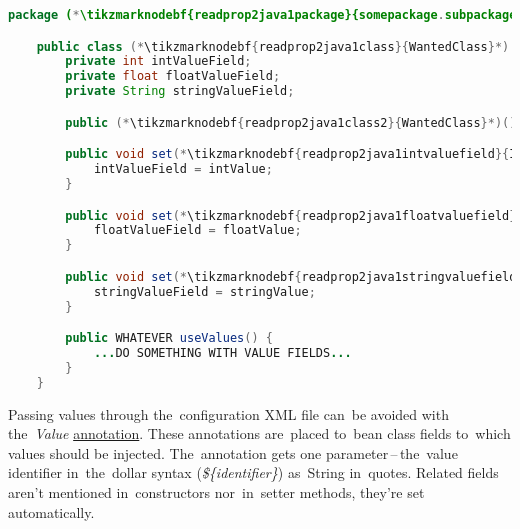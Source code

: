 \begin{lstlisting}[language=Java, title={Wanted class with the zero--parameter constructor and setter methods}]
    package (*\tikzmarknodebf{readprop2java1package}{somepackage.subpackage}*);

    public class (*\tikzmarknodebf{readprop2java1class}{WantedClass}*) implements WantedInterface {
        private int intValueField;
        private float floatValueField;
        private String stringValueField;

        public (*\tikzmarknodebf{readprop2java1class2}{WantedClass}*)() {}

        public void set(*\tikzmarknodebf{readprop2java1intvaluefield}{IntValueField}*)(int intValue) {
            intValueField = intValue;
        }

        public void set(*\tikzmarknodebf{readprop2java1floatvaluefield}{FloatValueField}*)(float floatValue) {
            floatValueField = floatValue;
        }

        public void set(*\tikzmarknodebf{readprop2java1stringvaluefield}{StringValueField}*)(string stringValue) {
            stringValueField = stringValue;
        }

        public WHATEVER useValues() {
            ...DO SOMETHING WITH VALUE FIELDS...
        }
    }
\end{lstlisting}
\newpage

\label{readingpropertiesannotations}
Passing values through the~configuration XML file can~be avoided with the~\textit{Value} \hyperref[javaannotation]{annotation}.
These annotations are~placed to~bean class fields to~which values should be injected.
The~annotation gets one parameter\,--\,the~value identifier in~the~dollar syntax (\textit{\$\{identifier\}}) as~String in~quotes.
Related fields aren't mentioned in~constructors nor~in~setter methods, they're set automatically.

